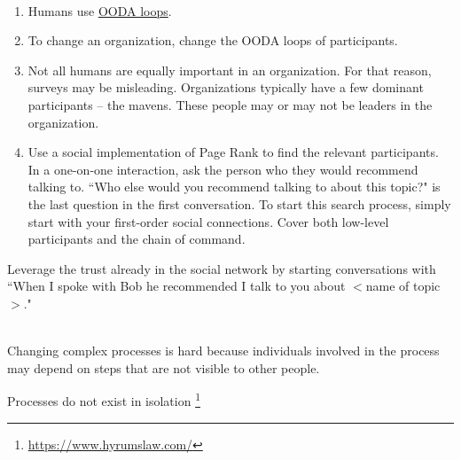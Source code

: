 \ \\

\begin{enumerate}
    \item Humans use \href{https://en.wikipedia.org/wiki/OODA_loop}{OODA loops}.
    \item To change an organization, change the OODA loops of participants.
    \item Not all humans are equally important in an organization. For that reason, surveys may be misleading. Organizations typically have a few dominant participants -- the mavens. These people may or may not be leaders in the organization.
    \item Use a social implementation of Page Rank to find the relevant participants. In a one-on-one interaction, ask the person who they would recommend talking to.
``Who else would you recommend talking to about this topic?" is the last question in the first conversation.
To start this search process, simply start with your first-order social connections. Cover both low-level participants and the chain of command.
\end{enumerate}

Leverage the trust already in the social network by starting conversations with ``When I spoke with Bob he recommended I talk to you about $<$name of topic$>$."





\ \\

Changing complex processes is hard because individuals involved in the process may depend on steps that are not visible to other people.


Processes do not exist in isolation
\footnote{\href{https://www.hyrumslaw.com/}{https://www.hyrumslaw.com/}} %
